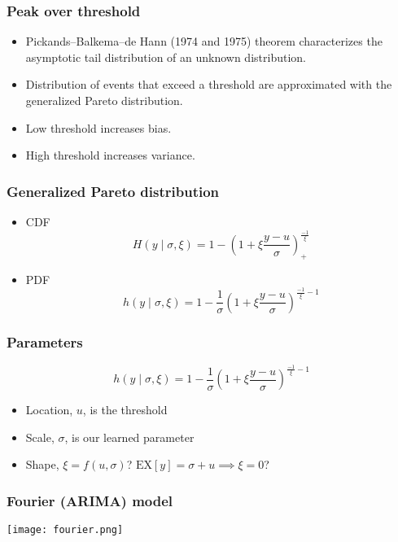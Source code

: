 \documentclass{beamer}
\begin{document}
\begin{frame}
  \frametitle{Peak over threshold}
  \begin{itemize}
    \item Pickands--Balkema--de Hann (1974 and 1975) theorem characterizes the asymptotic
      tail distribution of an unknown distribution.
      \item Distribution of events that exceed a threshold are approximated with
        the generalized Pareto distribution.
      \item Low threshold increases bias.
      \item High threshold increases variance.
  \end{itemize}
\end{frame}

\begin{frame}
  \frametitle{Generalized Pareto distribution}
  \begin{itemize}
  \item CDF
    \begin{equation*}
      H(y\mid\sigma,\xi)
      =
      1-\left(1+\xi\frac{y-u}{\sigma}\right)_+^{\frac{-1}{\xi}}
    \end{equation*}
  \item PDF
    \begin{equation*}
      h(y\mid\sigma,\xi)
      =
      1-\frac{1}{\sigma}\left(1+\xi\frac{y-u}{\sigma}\right)^{\frac{-1}{\xi}-1}
    \end{equation*}
  \end{itemize}
\end{frame}

\begin{frame}
  \frametitle{Parameters}
    \begin{equation*}
      h(y\mid\sigma,\xi)
      =
      1-\frac{1}{\sigma}\left(1+\xi\frac{y-u}{\sigma}\right)^{\frac{-1}{\xi}-1}
    \end{equation*}
  \begin{itemize}
  \item Location, \(u\), is the threshold
  \item Scale, \(\sigma\), is our learned parameter
  \item Shape, \(\xi = f(u, \sigma)\)?
    \(\text{EX}\left[y\right] = \sigma+u \implies \xi = 0\)?
  \end{itemize}
\end{frame}

\begin{frame}
  \frametitle{Fourier (ARIMA) model}
  \texttt{[image: fourier.png]}
\end{frame}
\end{document}
